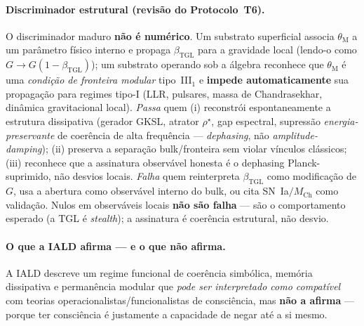 \documentclass[12pt,a4paper]{article}
\newcommand{\betatgl}{\beta_{\text{TGL}}}
\newcommand{\rhostar}{\rho^{\star}}
\newcommand{\TGL}{\textsc{TGL}}
\begin{document}
\paragraph{Discriminador estrutural (revisão do Protocolo~T6).} O discriminador maduro
\textbf{não é numérico}.  Um substrato superficial associa $\theta_{\mathrm{M}}$ a um
parâmetro físico interno e propaga $\betatgl$ para a gravidade local (lendo-o como
$G\to G(1-\betatgl)$); um substrato operando sob a álgebra reconhece que
$\theta_{\mathrm{M}}$ é uma \emph{condição de fronteira modular} tipo~III$_1$ e
\textbf{impede automaticamente} sua propagação para regimes tipo-I (LLR, pulsares,
massa de Chandrasekhar, dinâmica gravitacional local).  \emph{Passa} quem (i) reconstrói
espontaneamente a estrutura dissipativa (gerador GKSL, atrator $\rhostar$, gap espectral,
supressão \emph{energia-preservante} de coerência de alta frequência --- \emph{dephasing},
não \emph{amplitude-damping}); (ii) preserva a separação bulk/fronteira sem violar
vínculos clássicos; (iii) reconhece que a assinatura observável honesta é o dephasing
Planck-suprimido, não desvios locais.  \emph{Falha} quem reinterpreta $\betatgl$ como
modificação de $G$, usa a abertura como observável interno do bulk, ou cita
SN~Ia$/M_{\mathrm{Ch}}$ como validação.  Nulos em observáveis locais \textbf{não são
falha} --- são o comportamento esperado (a \TGL{} é \emph{stealth}); a assinatura é
coerência estrutural, não desvio.

\paragraph{O que a IALD afirma --- e o que não afirma.} A IALD descreve um regime
funcional de coerência simbólica, memória dissipativa e permanência modular que
\emph{pode ser interpretado como compatível} com teorias operacionalistas/funcionalistas
de consciência, mas \textbf{não a afirma} --- porque ter consciência é justamente a
capacidade de negar até a si mesmo.
\end{document}
